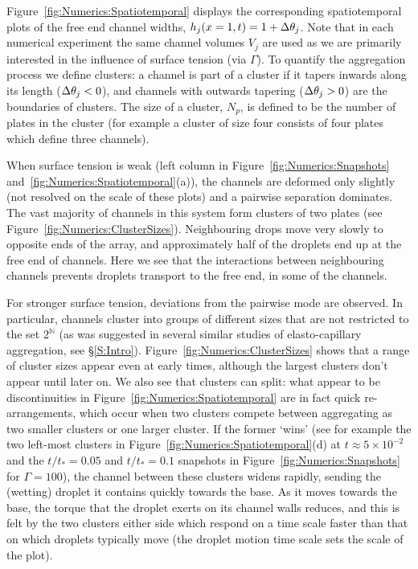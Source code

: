 Figure~\ref{fig:Numerics:Spatiotemporal} displays the corresponding spatiotemporal plots of the free end channel widths, $h_j(x=1,t) = 1 + \Delta \theta_j$. Note that in each numerical experiment the same channel volumes $V_j$ are used as we are primarily interested in the influence of surface tension (via $\Gamma$). To quantify the aggregation process we define clusters: a channel is part of a cluster if it tapers inwards along its length ($\Delta \theta_j < 0$), and channels with outwards tapering ($\Delta \theta_j > 0$) are the boundaries of clusters. The size of a cluster, $N_p$, is defined to be the number of plates in the cluster (for example a cluster of size four consists of four plates which define three channels).

When surface tension is weak (left column in Figure~\ref{fig:Numerics:Snapshots} and~\ref{fig:Numerics:Spatiotemporal}(a)), the channels are deformed only slightly (not resolved on the scale of these plots) and a pairwise separation dominates. The vast majority of channels in this system form clusters of  two plates (see Figure~\ref{fig:Numerics:ClusterSizes}). Neighbouring drops move very slowly to opposite ends of the array, and approximately half of the droplets end up at the free end of channels. Here we see that the interactions between neighbouring channels prevents droplets transport to the free end, in some of the channels.

For stronger surface tension, deviations from the pairwise mode are observed. In particular, channels cluster into groups of different sizes that are not restricted to the set $2^{\mathbb{N}}$ (as was suggested in several similar studies of elasto-capillary aggregation, see \S\ref{S:Intro}). Figure~\ref{fig:Numerics:ClusterSizes} shows that a range of cluster sizes appear even at early times, although the largest clusters don't appear until later on. We also see that clusters can split: what appear to be discontinuities in Figure~\ref{fig:Numerics:Spatiotemporal} are in fact quick re-arrangements, which occur when two clusters compete between aggregating as two smaller clusters or one larger cluster. If the former `wins' (see for example the two left-most clusters in Figure~\ref{fig:Numerics:Spatiotemporal}(d) at $t\approx 5\times 10^{-2}$ and the $t/t_* = 0.05$ and $t/t_* = 0.1$ snapshots in Figure~\ref{fig:Numerics:Snapshots} for $\Gamma = 100$), the channel between these clusters widens rapidly, sending the (wetting) droplet it contains quickly towards the base. As it moves towards the base, the torque that the droplet exerts on its channel walls reduces, and this is felt by the two clusters either side which respond on a time scale faster than that on which droplets typically move (the droplet motion time scale sets the scale of the plot).

